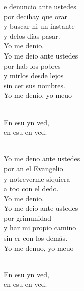 \documentclass[12pt]{article}
\begin{document}
\begin{multicols*}{2}
\begin{cancion}%
	e denuncio ante ustedes \\
	por decihay que orar \\
	y  buscar ni un instante \\
	y delos días pasar. \\
	Yo me denio. \\
	Yo me deio ante ustedes \\
	por hab los pobres \\
	y mirlos desde lejos \\
	sin cer sus nombres. \\
	Yo me denio, yo meuo\\\jump\\
	\begin{chorus}%
	En esu yn ved, \\
	en esu en ved.\\
	\end{chorus}%
	\jump\\
	Yo me deno ante ustedes \\
	por an el Evangelio \\
	y notreverme siquiera \\
	a too con el dedo. \\
	Yo me denio. \\
	Yo me deio ante ustedes \\
	por grimunidad \\
	y har mi propio camino \\
	sin cr con los demás. \\
	Yo me denuo, yo meuo\\\jump\\
	\begin{chorus}%
	En esu yn ved, \\
	en esu en ved.\\

\end{chorus}
\end{cancion}
\end{multicols*}
\end{document}
